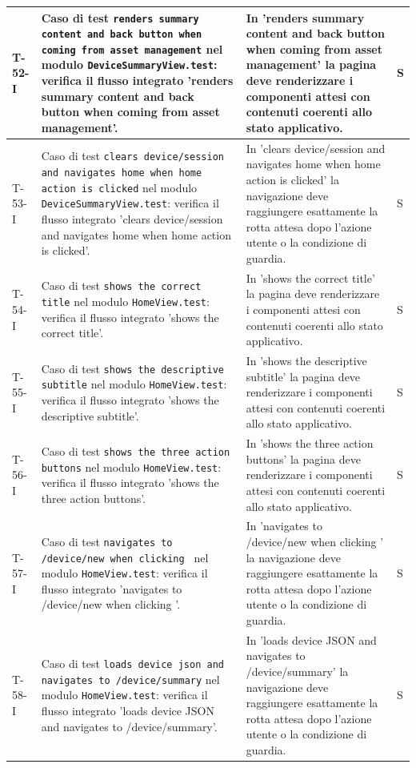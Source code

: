 \documentclass[a4paper,12pt]{article}
\begin{document}
{{\begin{longtable}{|>{\RaggedRight\arraybackslash}p{1.55cm}|>{\RaggedRight\arraybackslash}p{8.0cm}|>{\RaggedRight\arraybackslash}p{4.6cm}|>{\RaggedRight\arraybackslash}p{1.2cm}|}
        \hline
        T-52-I & Caso di test \texttt{renders summary content and back button when coming from asset management} nel modulo \texttt{DeviceSummaryView.test}: verifica il flusso integrato 'renders summary content and back button when coming from asset management'. & In 'renders summary content and back button when coming from asset management' la pagina deve renderizzare i componenti attesi con contenuti coerenti allo stato applicativo. & S \\
        \hline
        T-53-I & Caso di test \texttt{clears device/session and navigates home when home action is clicked} nel modulo \texttt{DeviceSummaryView.test}: verifica il flusso integrato 'clears device/session and navigates home when home action is clicked'. & In 'clears device/session and navigates home when home action is clicked' la navigazione deve raggiungere esattamente la rotta attesa dopo l'azione utente o la condizione di guardia. & S \\
        \hline
        T-54-I & Caso di test \texttt{shows the correct title} nel modulo \texttt{HomeView.test}: verifica il flusso integrato 'shows the correct title'. & In 'shows the correct title' la pagina deve renderizzare i componenti attesi con contenuti coerenti allo stato applicativo. & S \\
        \hline
        T-55-I & Caso di test \texttt{shows the descriptive subtitle} nel modulo \texttt{HomeView.test}: verifica il flusso integrato 'shows the descriptive subtitle'. & In 'shows the descriptive subtitle' la pagina deve renderizzare i componenti attesi con contenuti coerenti allo stato applicativo. & S \\
        \hline
        T-56-I & Caso di test \texttt{shows the three action buttons} nel modulo \texttt{HomeView.test}: verifica il flusso integrato 'shows the three action buttons'. & In 'shows the three action buttons' la pagina deve renderizzare i componenti attesi con contenuti coerenti allo stato applicativo. & S \\
        \hline
        T-57-I & Caso di test \texttt{navigates to /device/new when clicking } nel modulo \texttt{HomeView.test}: verifica il flusso integrato 'navigates to /device/new when clicking '. & In 'navigates to /device/new when clicking ' la navigazione deve raggiungere esattamente la rotta attesa dopo l'azione utente o la condizione di guardia. & S \\
        \hline
        T-58-I & Caso di test \texttt{loads device json and navigates to /device/summary} nel modulo \texttt{HomeView.test}: verifica il flusso integrato 'loads device JSON and navigates to /device/summary'. & In 'loads device JSON and navigates to /device/summary' la navigazione deve raggiungere esattamente la rotta attesa dopo l'azione utente o la condizione di guardia. & S \\

\end{longtable}}}
\end{document}
